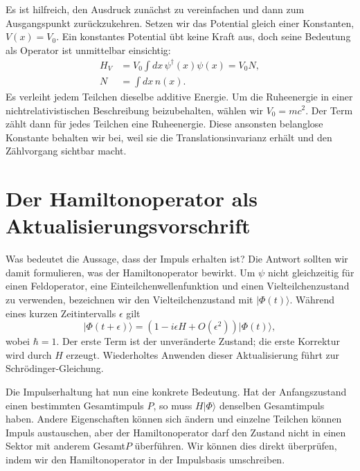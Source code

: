 Es ist hilfreich, den Ausdruck zunächst zu vereinfachen und dann zum Ausgangspunkt zurückzukehren. Setzen wir das Potential gleich einer Konstanten, \(V(x)=V_0\). Ein konstantes Potential übt keine Kraft aus, doch seine Bedeutung als Operator ist unmittelbar einsichtig:
\begin{equation}
\begin{aligned}
H_V&=V_0\int dx\,\psi^\dagger(x)\psi(x)=V_0N,\\
N&=\int dx\,n(x).
\end{aligned}
\end{equation}
Es verleiht jedem Teilchen dieselbe additive Energie. Um die Ruheenergie in einer nichtrelativistischen Beschreibung beizubehalten, wählen wir \(V_0=mc^2\). Der Term zählt dann für jedes Teilchen eine Ruheenergie. Diese ansonsten belanglose Konstante behalten wir bei, weil sie die Translationsinvarianz erhält und den Zählvorgang sichtbar macht.

\section{Der Hamiltonoperator als Aktualisierungsvorschrift}

Was bedeutet die Aussage, dass der Impuls erhalten ist? Die Antwort sollten wir damit formulieren, was der Hamiltonoperator bewirkt. Um \(\psi\) nicht gleichzeitig für einen Feldoperator, eine Einteilchenwellenfunktion und einen Vielteilchenzustand zu verwenden, bezeichnen wir den Vielteilchenzustand mit \(\lvert\Phi(t)\rangle\). Während eines kurzen Zeitintervalls \(\epsilon\) gilt
\begin{equation}
\lvert\Phi(t+\epsilon)\rangle
=\left(1-i\epsilon H+O(\epsilon^2)\right)
\lvert\Phi(t)\rangle,
\label{eq:l9-short-update}
\end{equation}
wobei \(\hbar=1\). Der erste Term ist der unveränderte Zustand; die erste Korrektur wird durch \(H\) erzeugt. Wiederholtes Anwenden dieser Aktualisierung führt zur Schr\"odinger-Gleichung.

Die Impulserhaltung hat nun eine konkrete Bedeutung. Hat der Anfangszustand einen bestimmten Gesamtimpuls \(P\), so muss \(H\lvert\Phi\rangle\) denselben Gesamtimpuls haben. Andere Eigenschaften können sich ändern und einzelne Teilchen können Impuls austauschen, aber der Hamiltonoperator darf den Zustand nicht in einen Sektor mit anderem Gesamt\(P\) überführen. Wir können dies direkt überprüfen, indem wir den Hamiltonoperator in der Impulsbasis umschreiben.

